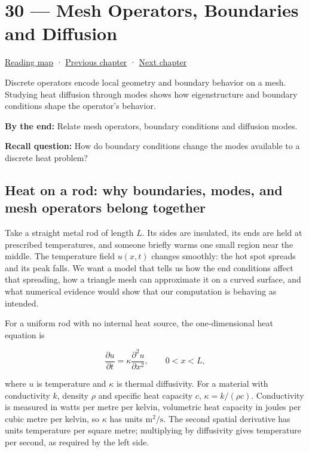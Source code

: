 \hypertarget{04-visual-computing-ii-ch030}{}
\chapter{30 --- Mesh Operators, Boundaries and Diffusion}\label{04-visual-computing-ii-ch030-mesh-operators-boundaries-and-diffusion}

\hyperref[volume-reading-map]{Reading map} · \hyperref[04-visual-computing-ii-ch029]{Previous chapter} · \hyperref[04-visual-computing-ii-ch031]{Next chapter}

Discrete operators encode local geometry and boundary behavior on a mesh. Studying heat diffusion through modes shows how eigenstructure and boundary conditions shape the operator's behavior.

\textbf{By the end:} Relate mesh operators, boundary conditions and diffusion modes.

\textbf{Recall question:} How do boundary conditions change the modes available to a discrete heat problem?

\section{Heat on a rod: why boundaries, modes, and mesh operators belong together}\label{04-visual-computing-ii-ch030-heat-on-a-rod-why-boundaries-modes-and-mesh-operators-belong-together}

Take a straight metal rod of length \(L\). Its sides are insulated, its ends are held at prescribed temperatures, and someone briefly warms one small region near the middle. The temperature field \(u(x,t)\) changes smoothly: the hot spot spreads and its peak falls. We want a model that tells us how the end conditions affect that spreading, how a triangle mesh can approximate it on a curved surface, and what numerical evidence would show that our computation is behaving as intended.

For a uniform rod with no internal heat source, the one-dimensional heat equation is

\[
\frac{\partial u}{\partial t}=\kappa\frac{\partial^2u}{\partial x^2},\qquad 0<x<L,
\]

where \(u\) is temperature and \(\kappa\) is thermal diffusivity. For a material with conductivity \(k\), density \(\rho\) and specific heat capacity \(c\), \(\kappa=k/(\rho c)\). Conductivity is measured in watts per metre per kelvin, volumetric heat capacity in joules per cubic metre per kelvin, so \(\kappa\) has units \(\mathrm{m^2/s}\). The second spatial derivative has units temperature per square metre; multiplying by diffusivity gives temperature per second, as required by the left side.


